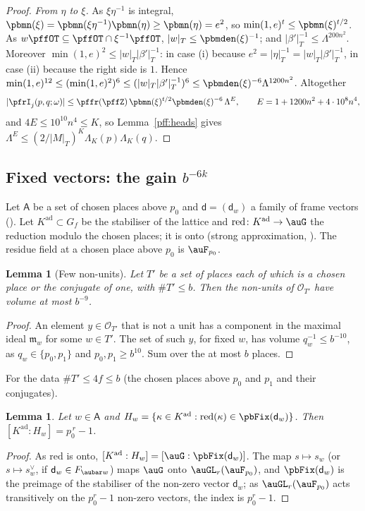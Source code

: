 \documentclass[10pt]{amsart}
\newtheorem{lemma}[theorem]{Lemma}
\theoremstyle{definition}
\theoremstyle{remark}
\providecommand{\auO}{\mathcal O}
\begin{document}
\begin{proof}
\emph{From $\eta$ to $\xi$.} As $\xi\eta^{-1}$ is integral, $\pbmn(\xi)=\pbmn(\xi\eta^{-1})\pbmn(\eta)\ge
\pbmn(\eta)=e^2$, so $\min(1,e)^t\le\pbmn(\xi)^{t/2}$. As $w\pffOT\subseteq\pffOT\cap\xi^{-1}\pffOT$,
$|w|_T\le\pbmden(\xi)^{-1}$; and $|\beta'|_T^{-1}\le\Lambda^{200n^2}$. Moreover $\min(1,e)^2\le|w|_T|\beta'|_T^{-1}$: in case (i) because $e^2=|\eta|_T^{-1}=|w|_T|\beta'|_T^{-1}$, in case (ii) because the right side is $1$. Hence $\min(1,e)^{12}\le(\min(1,e)^2)^6
\le(|w|_T|\beta'|_T^{-1})^6\le\pbmden(\xi)^{-6}\Lambda^{1200n^2}$. Altogether
\[
|\pfrI_j(p,q;\omega)|\le\pffr(\pffZ)\,\pbmn(\xi)^{t/2}\pbmden(\xi)^{-6}\,\Lambda^{E},\qquad E=1+1200n^2+4\cdot10^8
n^4,
\]
and $4E\le10^{10}n^4\le K$, so Lemma~\ref{pff:heads} gives $\Lambda^E\le(2/|M|_T)^K\Lambda_K(p)\Lambda_K(q)$.
\end{proof}


\subsection{Fixed vectors: the gain $b^{-6k}$}\label{pff:ss-fixed}

Let $\mathsf A$ be a set of chosen places above $p_0$ and $\mathsf d=(\mathsf d_w)$ a family of
frame vectors ({\cite[\S2.1]{P51}}). Let $K^{\mathrm{ad}}\subset G_f$ be the stabiliser of the
lattice and $\mathrm{red}\colon K^{\mathrm{ad}}\to\auG$ the reduction modulo the chosen places; it
is onto (strong approximation, {\cite[\S2.1]{P51}}). The residue field at a chosen place above
$p_0$ is $\auF_{p_0}$.

\begin{lemma}[Few non-units]\label{pff:nonunits}
Let $T'$ be a set of places each of which is a chosen place or the conjugate of one, with
$\#T'\le b$. Then the non-units of $\auO_{T'}$ have volume at most $b^{-9}$.
\end{lemma}
\begin{proof}
An element $y\in\auO_{T'}$ that is not a unit has a component in the maximal ideal $\mathfrak m_w$
for some $w\in T'$. The set of such $y$, for fixed $w$, has volume $q_w^{-1}\le b^{-10}$, as
$q_w\in\{p_0,p_1\}$ and $p_0,p_1\ge b^{10}$. Sum over the at most $b$ places.
\end{proof}

For the data $\#T'\le4f\le b$ (the chosen places above $p_0$ and $p_1$ and their conjugates).

\begin{lemma}\label{pff:index}
Let $w\in\mathsf A$ and $H_w=\{\kappa\in K^{\mathrm{ad}}:\mathrm{red}(\kappa)\in\pbFix(\mathsf d_w)\}$.
Then $[K^{\mathrm{ad}}:H_w]=p_0^{\,r}-1$.
\end{lemma}
\begin{proof}
As $\mathrm{red}$ is onto, $[K^{\mathrm{ad}}:H_w]=[\auG:\pbFix(\mathsf d_w)]$. The map $s\mapsto
s_w$ (or $s\mapsto s_w^\vee$, if $\mathsf d_w\in F_{\aubar w}$) maps $\auG$ onto $\auGL_r(\auF_{p_0})$,
and $\pbFix(\mathsf d_w)$ is the preimage of the stabiliser of the non-zero vector $\mathsf d_w$; as
$\auGL_r(\auF_{p_0})$ acts transitively on the $p_0^r-1$ non-zero vectors, the index is
$p_0^r-1$.
\end{proof}
\end{document}
